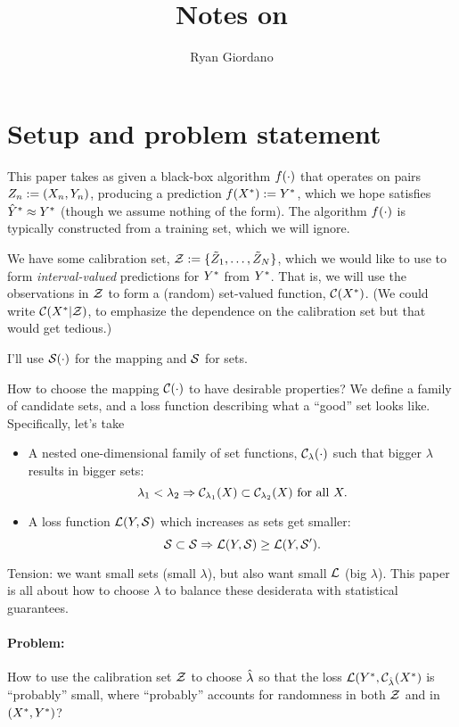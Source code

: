 \documentclass[twoside,11pt]{article}
\numberwithin{equation}{section}
\begin{document}
\title{Notes on \citet{bates:2021:distributionpredictionsets}}

\author{Ryan Giordano}


\maketitle

\section{Setup and problem statement}


This paper takes as given a black-box algorithm $f(\cdot)$ that operates on
pairs $Z_n := (X_n, Y_n)$, producing a prediction $f(X^{*}) := Y^{*}$,
which we hope satisfies $\hat{Y}^{*} \approx Y^{*}$ (though we assume nothing of the
form).  The algorithm $f(\cdot)$ is typically constructed from a training
set, which we will ignore.

We have some calibration set, $\mathcal{Z} := \{ \tilde{Z}_1, \ldots, \tilde{Z}_N\}$,
which we would like to use to form \textit{interval-valued} predictions
for $Y^{*}$ from $Y^{*}$.  That is, we will use the observations in $\mathcal{Z}$
to form a (random) set-valued function, $\mathcal{C}(X^{*})$.  (We could
write $\mathcal{C}(X^{*} | \mathcal{Z})$, to emphasize
the dependence on the calibration set but that would get tedious.)

I'll use $\mathcal{S}(\cdot)$ for the mapping and $\mathcal{S}$ for sets.

How to choose the mapping $\mathcal{C}(\cdot)$ to have desirable properties?
We define a family of candidate sets, and a loss function describing
what a ``good'' set looks like.  Specifically, let's take
%
\begin{itemize}
%
    \item A nested one-dimensional family of set functions,
    $\mathcal{C}_{\lambda}(\cdot)$ such that bigger $\lambda$ results in bigger sets:
    $$\lambda_1 < \lambda_2 \Rightarrow \mathcal{C}_{\lambda_1}(X) \subset
    \mathcal{C}_{\lambda_2}(X) \textrm{ for all }X.$$
    \item A loss function $\mathcal{L}(Y, \mathcal{S})$ which increases as sets get smaller:
    $$\mathcal{S} \subset \mathcal{S} \Rightarrow \mathcal{L}(Y, \mathcal{S}) \ge \mathcal{L}(Y,\mathcal{S}').$$
%
\end{itemize}
%
Tension: we want small sets (small $\lambda$), but also want small $\mathcal{L}$
(big $\lambda$).  This paper is all about how to choose $\lambda$
to balance these desiderata with statistical guarantees.

\paragraph{Problem: } How to use the calibration
set $\mathcal{Z}$ to choose $\hat{\lambda}$ so that the loss
$\mathcal{L}(Y^{*}, \mathcal{C}_{\hat{\lambda}}(X^{*})$ is ``probably'' small,
where ``probably'' accounts for randomness in both $\mathcal{Z}$
and in $(X^{*}, Y^{*})$?
\end{document}
